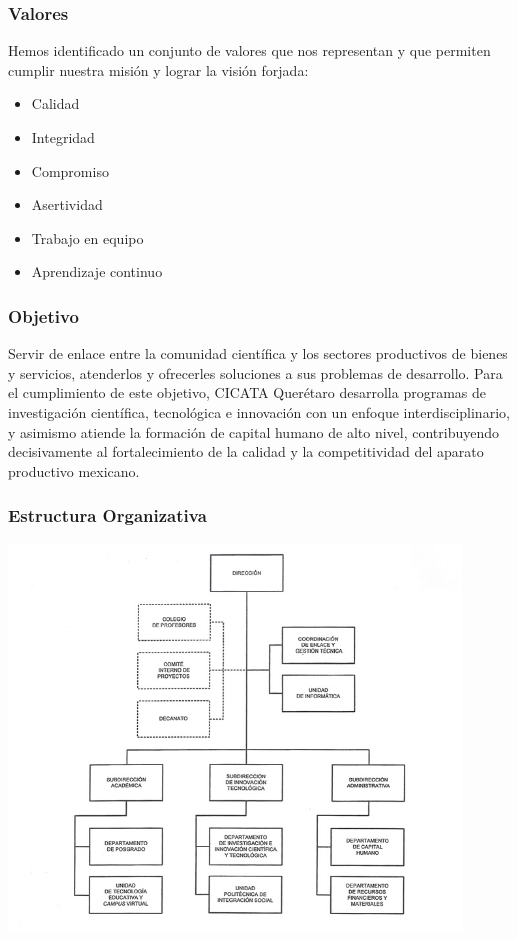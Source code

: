 \documentclass[12pt]{book} %
\begin{document}
		\subsubsection{Valores}
			Hemos identificado un conjunto de valores que nos representan y que permiten cumplir nuestra misión y lograr
			la visión forjada:
			\begin{multicols}{2}
				\begin{itemize}
					\item Calidad
					\item Integridad
					\item Compromiso
					\item Asertividad
					\item Trabajo en equipo
					\item Aprendizaje continuo
				\end{itemize}
			\end{multicols}		
			
		\subsubsection{Objetivo}
			Servir de enlace entre la comunidad científica y los sectores productivos de bienes y servicios, atenderlos
			y ofrecerles soluciones a sus problemas de desarrollo. Para el cumplimiento de este objetivo, CICATA
			Querétaro desarrolla programas de investigación científica, tecnológica e innovación con un enfoque
			interdisciplinario, y asimismo atiende la formación de capital humano de alto nivel, contribuyendo
 			decisivamente al fortalecimiento de la calidad y la competitividad del aparato productivo mexicano.
 		
 		\subsubsection{Estructura Organizativa}
 			\begin{center}
			 	\includegraphics[width=0.9\textwidth]{./imagenes/organigrama}
			 \end{center}
			 
\end{document}
